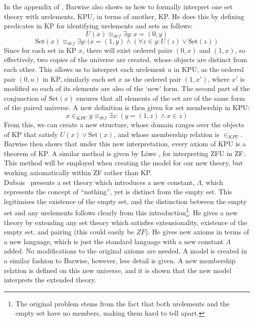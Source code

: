 \documentclass[11pt]{report}
\theoremstyle{definition}
\theoremstyle{theorem}
\theoremstyle{lemma}
\begin{document}
In the appendix of \cite{barwise}, Barwise also shows us how to formally interpret one set theory with urelements, KPU, in terms of another, KP.
He does this by defining predicates in KP for identifying urelements and sets as follows:
$$U(x) \equiv_{def} \exists y: x = (0,y)$$
$$\text{Set}(x) \equiv_{def} \exists y:(x = (1,y) \wedge (\forall z\in y: U(z) \vee \text{Set}(z))$$
Since for each set in KP $x$, there will exist ordered pairs $(0,x)$ and $(1,x)$, so effectively, two copies of the universe are created, whose objects are distinct from each other.
This allows us to interpret each urelement $u$ in KPU, as the ordered pair $(0,u)$ in KP, similarly each set $x$ as the ordered pair $(1,x')$, where $x'$ is modified so each of its elements are also of the `new' form.
The second part of the conjunction of $\text{Set}(x)$ ensures that all elements of the set are of the same form of the paired universe.
A new definition is then given for set membership in KPU:
$$x\in_{KPU} y \equiv_{def} \exists z: (y=(1,z) \wedge x\in z)$$
From this, we can create a new structure, whose domain ranges over the objects of KP that satisfy $U(x) \vee \text{Set}(x)$, and whose membership relation is $\in_{KPU}$.
Barwise then shows that under this new interpretation, every axiom of KPU is a theorem of KP.
A similar method is given by L\"owe \cite{lowe}, for interpreting ZFU in ZF.
This method will be employed when creating the model for our new theory, but working axiomatically within ZF rather than KP.\\

Dubois~\cite{dubois} presents a set theory which introduces a new constant, $\Lambda$, which represents the concept of ``nothing'', yet is distinct from the empty set.
This legitimises the existence of the empty set, and the distinction between the empty set and any urelements follows clearly from this introduction\footnote{The original problem stems from the fact that both urelements and the empty set have no members, making them hard to tell apart.}.
He gives a new theory by extending any set theory which satisfies extensionality, existence of the empty set, and pairing (this could easily be $\mathit{ZF}$).
He gives new axioms in terms of a new language, which is just the standard language with a new constant $\Lambda$ added. 
No modifications to the original axioms are needed.
A model is created in a similar fashion to Barwise, however, less detail is given.
A new membership relation is defined on this new universe, and it is shown that the new model interprets the extended theory.
\end{document}
